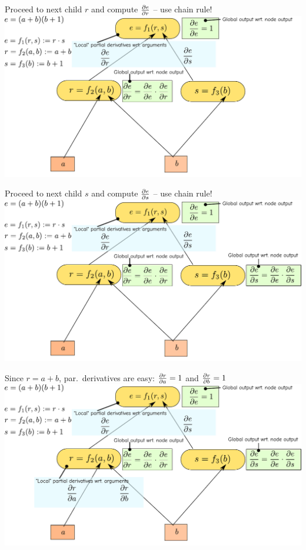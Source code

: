 \documentclass[12pt,aspectratio=169,handout]{beamer}
\begin{document}
\begin{frame}{Proceed to next child $r$ and compute $\pdv{e}{r}$ -- use chain rule!}
	\includegraphics[width=1.2\linewidth]{img/backprop05.pdf}
	
	
\end{frame}

\begin{frame}{Proceed to next child $s$ and compute $\pdv{e}{s}$ -- use chain rule!}
	\includegraphics[width=1.2\linewidth]{img/backprop06.pdf}
\end{frame}

\begin{frame}{Since $r = a + b$, par.\ derivatives are easy: $\pdv{r}{a} = 1$ and $\pdv{r}{b} = 1$}
	\includegraphics[width=1.2\linewidth]{img/backprop07.pdf}
\end{frame}
\end{document}

